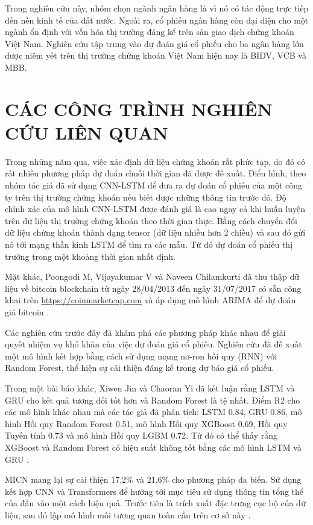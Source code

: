 \documentclass[conference]{IEEEtran}
\begin{document}
Trong nghiên cứu này, nhóm chọn ngành ngân hàng là vì nó có tác động trực tiếp đến nền kinh tế của đất nước. Ngoài ra, cổ phiếu ngân hàng còn đại diện cho một ngành ổn định với vốn hóa thị trường đáng kể trên sàn giao dịch chứng khoán Việt Nam. Nghiên cứu tập trung vào dự đoán giá cổ phiếu cho ba ngân hàng lớn được niêm yết trên thị trường chứng khoán Việt Nam hiện nay là BIDV, VCB và MBB.

\section{CÁC CÔNG TRÌNH NGHIÊN CỨU LIÊN QUAN}
Trong những năm qua, việc xác định dữ liệu chứng khoán rất phức tạp, do đó có rất nhiều phương pháp dự đoán chuỗi thời gian đã được đề xuất. Điển hình, theo \cite{predictStockCNNLSTM} nhóm tác giả đã sử dụng CNN-LSTM để đưa ra dự đoán cổ phiếu của một công ty trên thị trường chứng khoán nếu biết được những thông tin trước đó. Độ chính xác của mô hình CNN-LSTM được đánh giá là cao ngay cả khi huấn luyện trên dữ liệu thị trường chứng khoán theo thời gian thực. Bằng cách chuyển đổi dữ liệu chứng khoán thành dạng tensor (dữ liệu nhiều hơn 2 chiều) và sau đó gửi nó tới mạng thần kinh LSTM để tìm ra các mẫu. Từ đó dự đoán cổ phiếu thị trường trong một khoảng thời gian nhất định.

Mặt khác, Poongodi M, Vijayakumar V và Naveen Chilamkurti đã thu thập dữ liệu về bitcoin blockchain từ ngày 28/04/2013 đến ngày 31/07/2017 có sẵn công khai trên
\href{https://coinmarketcap.com}{https://coinmarketcap.com} và áp dụng mô hình ARIMA để dự đoán giá bitcoin \cite{predictBitcoinARIMA}.

Các nghiên cứu trước đây đã khám phá các phương pháp khác nhau để giải quyết nhiệm vụ khó khăn của việc dự đoán giá cổ phiếu. \cite{randomForestAndLSTM} Nghiên cứu đã đề xuất một mô hình kết hợp bằng cách sử dụng mạng nơ-ron hồi quy (RNN) với Random Forest, thể hiện sự cải thiện đáng kể trong dự báo giá cổ phiếu.

Trong một bài báo khác, Xiwen Jin và Chaoran Yi đã kết luận rằng LSTM và GRU cho kết quả tương đối tốt hơn và Random Forest là tệ nhất. Điểm R2 cho các mô hình khác nhau mà các tác giả đã phân tích: LSTM 0.84, GRU 0.86, mô hình Hồi quy Random Forest 0.51, mô hình Hồi quy XGBoost 0.69, Hồi quy Tuyến tính 0.73 và mô hình Hồi quy LGBM 0.72. Từ đó có thể thấy rằng XGBoost và Random Forest có hiệu suất không tốt bằng  các mô hình LSTM và GRU \cite{comparationLinearRegression}.

MICN mang lại sự cải thiện 17,2\% và 21,6\% cho phương pháp đa biến. Sử dụng kết hợp CNN và Transformers để hướng tới mục tiêu sử dụng thông tin tổng thể của đầu vào một cách hiệu quả. Trước tiên là trích xuất đặc trưng cục bộ của dữ liệu, sau đó lập mô hình mối tương quan toàn cầu trên cơ sở này \cite{MICN}.
\end{document}
